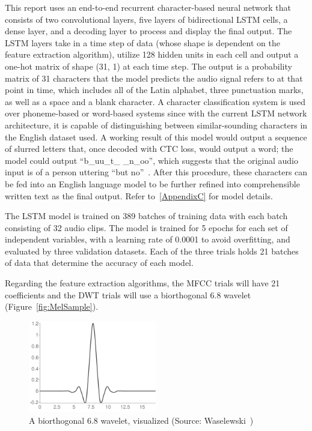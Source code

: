This report uses an end-to-end recurrent character-based neural network that consists of two convolutional layers, five layers of bidirectional LSTM cells, a dense layer, and a decoding layer to process and display the final output. The LSTM layers take in a time step of data (whose shape is dependent on the feature extraction algorithm), utilize 128 hidden units in each cell and output a one-hot matrix of shape (31, 1) at each time step. The output is a probability matrix of 31 characters that the model predicts the audio signal refers to at that point in time, which includes all of the Latin alphabet, three punctuation marks, as well as a space and a blank character. A character classification system is used over phoneme-based or word-based systems since with the current LSTM network architecture, it is capable of distinguishing between similar-sounding characters in the English dataset used. A working result of this model would output a sequence of slurred letters that, once decoded with CTC loss, would output a word; the model could output “b\_uu\_t\_  \_n\_oo”, which suggests that the original audio input is of a person uttering “but no”~\cite{graves_fernández_gomez_schmidhuber_2006,scheidl_2018}. After this procedure, these characters can be fed into an English language model to be further refined into comprehensible written text as the final output. Refer to~\autoref{AppendixC} for model details.
\par
The LSTM model is trained on 389 batches of training data with each batch consisting of 32 audio clips. The model is trained for 5 epochs for each set of independent variables, with a learning rate of 0.0001 to avoid overfitting, and evaluated by three validation datasets. Each of the three trials holds 21 batches of data that determine the accuracy of each model.
\par
Regarding the feature extraction algorithms, the MFCC trials will have 21 coefficients and the DWT trials will use a biorthogonal 6.8 wavelet (Figure~\ref{fig:MelSample}).

\begin{figure}[th]
    \centering
    \includegraphics[width=0.5\textwidth]{Figures/wavelet.png}
    \decoRule
    \caption[Bior Wavelet]{A biorthogonal 6.8 wavelet, visualized (Source: Waselewski~\cite{wasilewski_2008})}
    \label{fig:BiorWavelet}
\end{figure}

